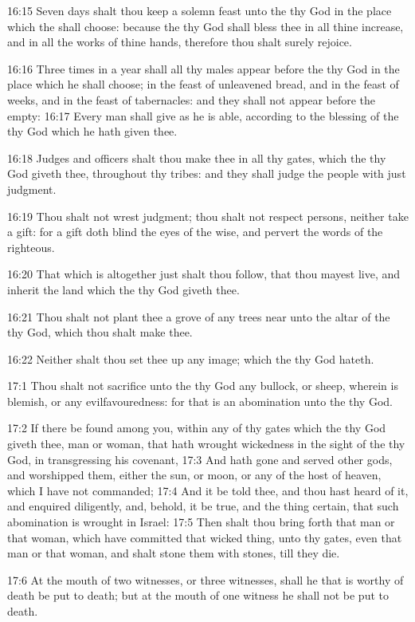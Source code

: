16:15 Seven days shalt thou keep a solemn feast unto the \LORD thy God in the place which the \LORD shall choose: because the \LORD thy God shall bless thee in all thine increase, and in all the works of thine hands, therefore thou shalt surely rejoice.

16:16 Three times in a year shall all thy males appear before the \LORD thy God in the place which he shall choose; in the feast of unleavened bread, and in the feast of weeks, and in the feast of tabernacles: and they shall not appear before the \LORD empty: 16:17 Every man shall give as he is able, according to the blessing of the \LORD thy God which he hath given thee.

16:18 Judges and officers shalt thou make thee in all thy gates, which the \LORD thy God giveth thee, throughout thy tribes: and they shall judge the people with just judgment.

16:19 Thou shalt not wrest judgment; thou shalt not respect persons, neither take a gift: for a gift doth blind the eyes of the wise, and pervert the words of the righteous.

16:20 That which is altogether just shalt thou follow, that thou mayest live, and inherit the land which the \LORD thy God giveth thee.

16:21 Thou shalt not plant thee a grove of any trees near unto the altar of the \LORD thy God, which thou shalt make thee.

16:22 Neither shalt thou set thee up any image; which the \LORD thy God hateth.

17:1 Thou shalt not sacrifice unto the \LORD thy God any bullock, or sheep, wherein is blemish, or any evilfavouredness: for that is an abomination unto the \LORD thy God.

17:2 If there be found among you, within any of thy gates which the \LORD thy God giveth thee, man or woman, that hath wrought wickedness in the sight of the \LORD thy God, in transgressing his covenant, 17:3 And hath gone and served other gods, and worshipped them, either the sun, or moon, or any of the host of heaven, which I have not commanded; 17:4 And it be told thee, and thou hast heard of it, and enquired diligently, and, behold, it be true, and the thing certain, that such abomination is wrought in Israel: 17:5 Then shalt thou bring forth that man or that woman, which have committed that wicked thing, unto thy gates, even that man or that woman, and shalt stone them with stones, till they die.

17:6 At the mouth of two witnesses, or three witnesses, shall he that is worthy of death be put to death; but at the mouth of one witness he shall not be put to death.

